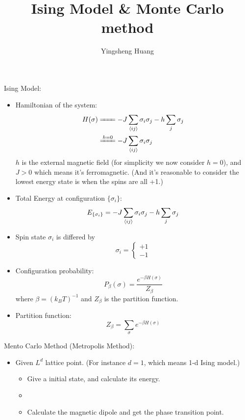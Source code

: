 \documentclass{article}
\title{Ising Model \& Monte Carlo method}
\author{Yingsheng Huang}
\newcommand{\s}{\sigma}
\begin{document}
\maketitle
Ising Model:
\begin{itemize}
  \item Hamiltonian of the system:
  \begin{align*}
    H(\sigma)&\xlongequal{\phantom{h=0}}-J\sum_{\expval{ij}}\sigma_i\sigma_j-h\sum_{j}\sigma_j\\
    &\xlongequal{h=0}-J\sum_{\expval{ij}}\sigma_i\sigma_j
  \end{align*}
  $h$ is the external magnetic field (for simplicity we now consider $h=0$), and $J>0$ which means it's ferromagnetic. (And it's reasonable to consider the lowest energy state is when the spins are all +1.)
  \item Total Energy at configuration $\{\sigma_i\}$:
  $$E_{\{\sigma_i\}}=-J\sum_{\expval{ij}}\sigma_i\sigma_j-h\sum_{j}\sigma_j$$
  \item Spin state $\sigma_i$ is differed by
  $$\sigma_i=\begin{cases}
  +1\\-1
  \end{cases}$$
  \item Configuration probability:
  $$P_{\beta}(\s)=\frac{e^{-\beta H(\s)}}{Z_{\beta}}$$
  where $\beta=(k_BT)^{-1}$ and $Z_{\beta}$ is the partition function.
  \item Partition function:
  $$Z_{\beta}=\sum_{\sigma}e^{-\beta H(\sigma)}$$


\end{itemize}
Mento Carlo Method (Metropolis Method):
\begin{itemize}
  \item Given $L^d$ lattice point. (For instance $d=1$, which means 1-d Ising model.)

  \begin{itemize}{(1)}
    \item Give a initial state, and calculate its energy.
    \item  
    \item Calculate the magnetic dipole and get the phase transition point.
  \end{itemize}
\end{itemize}
\end{document}
